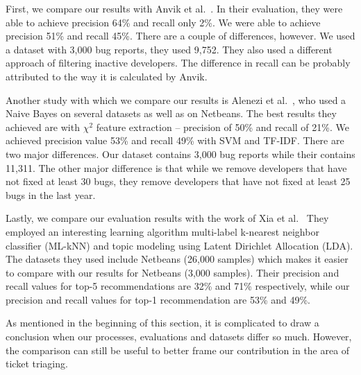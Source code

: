 First, we compare our results with Anvik et al.~\cite{Anvik2006}. In their evaluation, they were able to achieve precision 64\% and recall only 2\%. We were able to achieve precision 51\% and recall 45\%. There are a couple of differences, however. We used a dataset with 3,000 bug reports, they used 9,752. They also used a different approach of filtering inactive developers. The difference in recall can be probably attributed to the way it is calculated by Anvik.

Another study with which we compare our results is Alenezi et al.~\cite{Alenezi2013}, who used a Naive Bayes on several datasets as well as on Netbeans. The best results they achieved are with $\chi^2$ feature extraction -- precision of 50\% and recall of 21\%. We achieved precision value 53\% and recall 49\% with SVM and TF-IDF. There are two major differences. Our dataset contains 3,000 bug reports while their contains 11,311. The other major difference is that while we remove developers that have not fixed at least 30 bugs, they remove developers that have not fixed at least 25 bugs in the last year.

Lastly, we compare our evaluation results with the work of Xia et al.~\cite{Xia2015} They employed an interesting learning algorithm multi-label k-nearest neighbor classifier (ML-kNN) and topic modeling using Latent Dirichlet Allocation (LDA). The datasets they used include Netbeans (26,000 samples) which makes it easier to compare with our results for Netbeans (3,000 samples). Their precision and recall values for top-5 recommendations are 32\% and 71\% respectively, while our precision and recall values for top-1 recommendation are 53\% and 49\%.

As mentioned in the beginning of this section, it is complicated to draw a conclusion when our processes, evaluations and datasets differ so much. However, the comparison can still be useful to better frame our contribution in the area of ticket triaging.